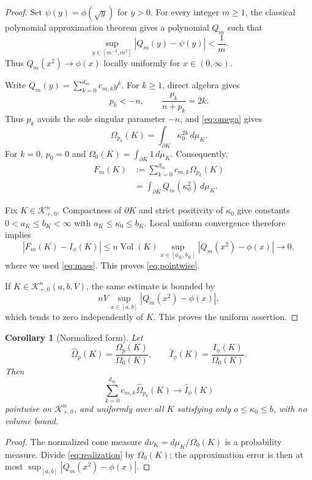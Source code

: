 \documentclass[11pt]{article}
\newtheorem{corollary}{Corollary}
\newcommand{\Kclass}{\mathcal K^n_{+,0}}
\newcommand{\vol}{\operatorname{Vol}}
\begin{document}
\begin{proof}
Set $\psi(y)=\phi(\sqrt y)$ for $y>0$. For every integer $m\geq1$, the
classical polynomial approximation theorem \cite[Chapter 7]{Rudin} gives a polynomial $Q_m$ such
that
\begin{equation}
 \sup_{y\in[m^{-2},m^2]}|Q_m(y)-\psi(y)|<\frac1m.
 \label{eq:approx}
\end{equation}
Thus $Q_m(x^2)\to\phi(x)$ locally uniformly for $x\in(0,\infty)$.

Write $Q_m(y)=\sum_{k=0}^{d_m}c_{m,k}y^k$. For $k\geq1$, direct algebra gives
\begin{equation}
 p_k<-n,
 \qquad
 \frac{p_k}{n+p_k}=2k.
 \label{eq:parameter}
\end{equation}
Thus $p_k$ avoids the sole singular parameter $-n$, and
\eqref{eq:omega} gives
\[
 \Omega_{p_k}(K)=\int_{\partial K}\kappa_0^{2k}\,d\mu_K.
\]
For $k=0$, $p_0=0$ and
$\Omega_0(K)=\int_{\partial K}1\,d\mu_K$. Consequently,
\begin{align}
 F_m(K)
 &:=\sum_{k=0}^{d_m}c_{m,k}\Omega_{p_k}(K)\\
 &=\int_{\partial K}Q_m(\kappa_0^2)\,d\mu_K.
 \label{eq:realization}
\end{align}

Fix $K\in\Kclass$. Compactness of $\partial K$ and strict positivity of
$\kappa_0$ give constants $0<a_K\leq b_K<\infty$ with
$a_K\leq\kappa_0\leq b_K$. Local uniform convergence therefore implies
\[
 |F_m(K)-I_\phi(K)|
 \leq n\vol(K)\sup_{x\in[a_K,b_K]}
 |Q_m(x^2)-\phi(x)|\longrightarrow0,
\]
where we used \eqref{eq:mass}. This proves \eqref{eq:pointwise}.

If $K\in\Kclass(a,b,V)$, the same estimate is bounded by
\[
 nV\sup_{x\in[a,b]}|Q_m(x^2)-\phi(x)|,
\]
which tends to zero independently of $K$. This proves the uniform assertion.
\end{proof}

\begin{corollary}[Normalized form]
Let
\[
 \widehat\Omega_p(K)=\frac{\Omega_p(K)}{\Omega_0(K)},
 \qquad
 \widehat I_\phi(K)=\frac{I_\phi(K)}{\Omega_0(K)}.
\]
Then
\[
 \sum_{k=0}^{d_m}c_{m,k}\widehat\Omega_{p_k}(K)
 \longrightarrow\widehat I_\phi(K)
\]
pointwise on $\Kclass$, and uniformly over all $K$ satisfying only
$a\leq\kappa_0\leq b$, with no volume bound.
\end{corollary}

\begin{proof}
The normalized cone measure
$d\nu_K=d\mu_K/\Omega_0(K)$ is a probability measure. Divide
\eqref{eq:realization} by $\Omega_0(K)$; the approximation error is then at
most $\sup_{[a,b]}|Q_m(x^2)-\phi(x)|$.
\end{proof}
\end{document}

